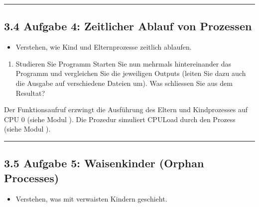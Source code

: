 \documentclass[a4paper,10pt,english]{report}
\begin{document}
\bigskip\hrule\bigskip



\subsection{3.4 Aufgabe 4: Zeitlicher Ablauf von Prozessen}
\label{\detokenize{P07_Prozesse_und_Threads/README:aufgabe-4-zeitlicher-ablauf-von-prozessen}}
\sphinxAtStartPar
{}
\begin{itemize}
\item {} 
\sphinxAtStartPar
Verstehen, wie Kind\sphinxhyphen{} und Elternprozesse zeitlich ablaufen.

\end{itemize}

\sphinxAtStartPar
{}
\begin{enumerate}
%
\item {} 
\sphinxAtStartPar
Studieren Sie Programm  Starten Sie nun mehrmals hintereinander das Programm  und vergleichen Sie die jeweiligen Outputs (leiten Sie dazu auch die Ausgabe auf verschiedene Dateien um). Was schliessen Sie aus dem Resultat?

\begin{sphinxVerbatim}[commandchars=\\\{\}]

\end{sphinxVerbatim}

\end{enumerate}

\sphinxAtStartPar
{} Der Funktionsaufruf  erzwingt die Ausführung des Eltern\sphinxhyphen{} und Kindprozesses auf CPU 0 (siehe Modul ). Die Prozedur  simuliert CPU\sphinxhyphen{}Load durch den Prozess (siehe Modul ).


\bigskip\hrule\bigskip



\subsection{3.5 Aufgabe 5: Waisenkinder (Orphan Processes)}
\label{\detokenize{P07_Prozesse_und_Threads/README:aufgabe-5-waisenkinder-orphan-processes}}
\sphinxAtStartPar
{}
\begin{itemize}
\item {} 
\sphinxAtStartPar
Verstehen, was mit verwaisten Kindern geschieht.

\end{itemize}
\end{document}
